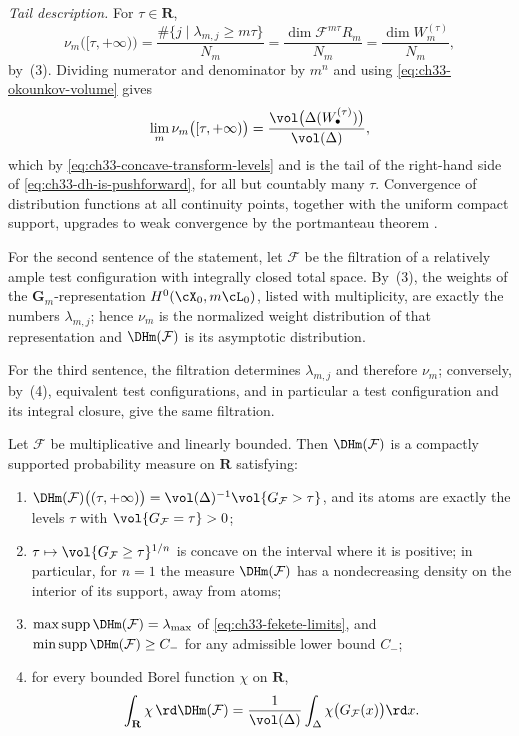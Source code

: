 \emph{Tail description.}  For $\tau\in\mathbf R$,
\begin{equation}
\label{eq:ch33-nu-tail}
 \nu_m\bigl([\tau,+\infty)\bigr)
 =\frac{\#\{j\mid\lambda_{m,j}\geq m\tau\}}{N_m}
 =\frac{\dim\mathcal F^{m\tau}R_m}{N_m}
 =\frac{\dim W^{(\tau)}_m}{N_m},
\end{equation}
by \,(3).  Dividing numerator and
denominator by $m^n$ and using \eqref{eq:ch33-okounkov-volume} gives
\[
 \lim_{m}\nu_m\bigl([\tau,+\infty)\bigr)
 =\frac{\vol\bigl(\Delta(W^{(\tau)}_\bullet)\bigr)}{\vol(\Delta)} ,
\]
which by \eqref{eq:ch33-concave-transform-levels} and
 is the tail of the right-hand side of
\eqref{eq:ch33-dh-is-pushforward}, for all but countably many $\tau$.
Convergence of distribution functions at all continuity points, together
with the uniform compact support, upgrades to weak convergence by the
portmanteau theorem .

For the second sentence of the statement, let $\mathcal F$ be the
filtration of a relatively ample test configuration with integrally closed
total space.  By \,(3), the weights of
the $\mathbf G_m$-representation $H^0(\cX_0,m\cL_0)$, listed with
multiplicity, are exactly the numbers $\lambda_{m,j}$; hence $\nu_m$ is
the normalized weight distribution of that representation and
$\DHm(\mathcal F)$ is its asymptotic distribution.

For the third sentence, the filtration determines $\lambda_{m,j}$ and
therefore $\nu_m$; conversely, by
\,(4), equivalent test
configurations, and in particular a test configuration and its integral
closure, give the same filtration.

\begin{corollary}
\label{cor:ch33-dh-structure}
Let $\mathcal F$ be multiplicative and linearly bounded.  Then
$\DHm(\mathcal F)$ is a compactly supported probability measure on
$\mathbf R$ satisfying:
\begin{enumerate}
\item $\DHm(\mathcal F)\bigl((\tau,+\infty)\bigr)
 =\vol(\Delta)^{-1}\vol\{G_{\mathcal F}>\tau\}$, and its atoms are exactly
 the levels $\tau$ with $\vol\{G_{\mathcal F}=\tau\}>0$;
\item $\tau\mapsto\vol\{G_{\mathcal F}\geq\tau\}^{1/n}$ is concave on the
 interval where it is positive; in particular, for $n=1$ the measure
 $\DHm(\mathcal F)$ has a nondecreasing density on the interior of its
 support, away from atoms;
\item $\max\operatorname{supp}\DHm(\mathcal F)=\lambda_{\max}$ of
 \eqref{eq:ch33-fekete-limits}, and
 $\min\operatorname{supp}\DHm(\mathcal F)\geq C_-$ for any admissible
 lower bound $C_-$;
\item for every bounded Borel function $\chi$ on $\mathbf R$,
\begin{equation}
\label{eq:ch33-dh-moment-formula}
 \int_{\mathbf R}\chi\,\rd\DHm(\mathcal F)
 =\frac{1}{\vol(\Delta)}\int_\Delta\chi\bigl(G_{\mathcal F}(x)\bigr)\rd x .
\end{equation}
\end{enumerate}
\end{corollary}

